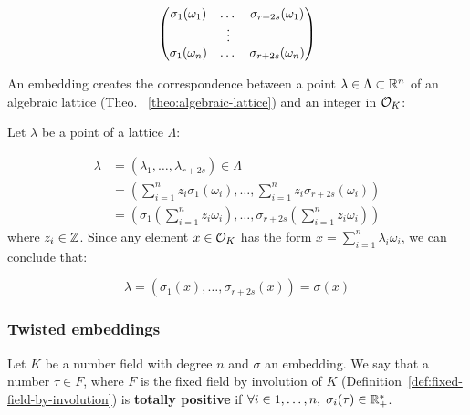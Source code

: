 \documentclass[a4paper,12pt]{article}
\begin{document}
\begin{equation}
  \label{def:gen-matrix-alg-lattices}
  \begin{pmatrix}
    \sigma_1(\omega_1) & $\dots$ &  \sigma_{r+2s}(\omega_1) \\
    & \vdots & \\
    \sigma_1(\omega_n) & $\dots$ & \sigma_{r+2s}(\omega_n) \\
  \end{pmatrix}  
\end{equation}

\begin{remark}\label{rem:lat-int-correspondence}
  An embedding creates the correspondence between a point $\lambda \in \Lambda \subset \mathbb{R}^n$ of an algebraic lattice (Theo.
 ~\ref{theo:algebraic-lattice}) and an integer in $\mathcal{O}_K$:

  Let $\lambda$ be a point of a lattice $\Lambda$:

\begin{align*} 
     \lambda &= (\lambda_1,\dots,\lambda_{r+2s}) \in \Lambda \\
       &= \left( \sum_{i=1}^n{z_i\sigma_1(\omega_i)} , \dots , \sum_{i=1}^n{z_i\sigma_{r+2s}(\omega_i)} \right) \\
       &= \left( \sigma_1\left(   \sum_{i=1}^n{z_i\omega_i} \right) , \dots , \sigma_{r+2s} \left( \sum_{i=1}^n{z_i\omega_i}  \right) \right) 
\end{align*}
  where $z_i \in \mathbb{Z}$. Since any element $x \in \mathcal{O}_K$ has the form $x =
  \sum_{i=1}^n{\lambda_i\omega_i}$, we can conclude that:

  \begin{equation*}
    \lambda = \left( \sigma_1(x), \dots, \sigma_{r+2s}(x) \right) = \sigma(x)
  \end{equation*}

\end{remark}

\subsubsection{Twisted embeddings}
\label{sec:org2d010e7}

\begin{definition}
  Let $K$ be a number field with degree $n$ and $\sigma$ an embedding. We say that a
  number $\tau \in F$, where $F$ is the fixed field by involution of $K$ (Definition~\ref{def:fixed-field-by-involution}) is \textbf{totally  positive} if $\forall i \in {1, \dots , n}, \; \sigma_i(\tau) \in \mathbb{R}^*_+$. 
\end{definition}
\end{document}
